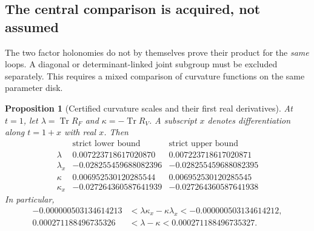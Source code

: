 \documentclass[11pt]{article}
\newtheorem{proposition}[proposition]{Proposition}
\theoremstyle{definition}
\theoremstyle{remark}
\newcommand{\Tr}{\operatorname{Tr}}
\begin{document}
\subsection{The central comparison is acquired, not assumed}
The two factor holonomies do not by themselves prove their product for the
\emph{same} loops. A diagonal or determinant-linked joint subgroup must
be excluded separately. This requires a mixed comparison of curvature
functions on the same parameter disk.

\begin{proposition}[Certified curvature scales and their first real derivatives]
\label{prop:v9-curvature-numbers}
At $t=1$, let $\lambda=\Tr R_F$ and $\kappa=-\Tr R_V$. A subscript $x$
denotes differentiation along $t=1+x$ with real $x$. Then
\begin{equation}
 \begin{array}{c|rr}
 &\text{strict lower bound}&\text{strict upper bound}\\ \hline
 \lambda&0.007223718617020870&0.007223718617020871\\
 \lambda_x&-0.028255459688082396&-0.028255459688082395\\
 \kappa&0.006952530120285544&0.006952530120285545\\
 \kappa_x&-0.027264360587641939&-0.027264360587641938
 \end{array}
 \label{eq:v9-curv-table}
\end{equation}
In particular,
\begin{align}
 -0.000000503134614213
 &<\lambda\kappa_x-\kappa\lambda_x
 <-0.000000503134614212, \label{eq:v9-central-W}\\
 0.000271188496735326
 &<\lambda-\kappa
 <0.000271188496735327. \label{eq:v9-det-difference}
\end{align}
\end{proposition}
\end{document}
